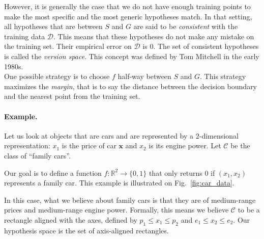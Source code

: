 \documentclass[a4paper,12pt]{article}
\newcommand{\cc}{\mathcal{C}}
\newcommand{\dd}{\mathcal{D}}
\newcommand{\xx}{{\bm x}}
\begin{document}
However, it is generally the case that we do not have enough training points to make the most specific and the most generic hypotheses match. In that setting, all hypotheses that are between $S$ and $G$ are said to be {\em consistent} with the training data $\dd$. This means that these hypotheses do not make any mistake on the training set. Their empirical error on $\dd$ is $0$. The set of consistent hypotheses is called the {\em version space}. This concept was defined by Tom Mitchell in the early 1980s.\\

One possible strategy is to choose $f$ half-way between $S$ and $G$. This strategy maximizes the {\em margin}, that is to say the distance between the decision boundary and the nearest point from the training set.



\paragraph{Example.} Let us look at objects that are cars and are represented by a $2$-dimensional representation: $x_1$ is the price of car $\xx$ and $x_2$ is its engine power. Let $\cc$ be the class of ``family cars''. 

Our goal is to define a function $f: \mathbb{R}^2 \rightarrow \{0, 1\}$ that only returns $0$ if $(x_1, x_2)$ represents a family car. This example is illustrated on Fig.~\ref{fig:car_data}. 

In this case, what we believe about family cars is that they are of medium-range prices and medium-range engine power. Formally, this means we believe $\cc$ to be a rectangle aligned with the axes, defined by $p_1 \leq x_1 \leq p_2$ and $e_1 \leq x_2 \leq e_2$. Our hypothesis space is the set of axis-aligned rectangles.
\end{document}
